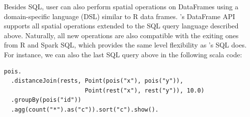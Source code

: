  Besides SQL, user can also perform
spatial operations on DataFrames using a domain-specific language
(DSL) similar to R data frames. \name's DataFrame API supports all
spatial operations extended to the SQL query language described
above. Naturally, all new operations are also compatible with the
exiting ones from R and Spark SQL, which provides the same level
flexibility as \name's SQL does. For instance, we can also the last
SQL query above in the following scala code:
\begin{lstlisting}
pois.
  .distanceJoin(rests, Point(pois("x"), pois("y")),
                       Point(rest("x"), rest("y")), 10.0)
  .groupBy(pois("id"))
  .agg(count("*").as("c")).sort("c").show().
\end{lstlisting}

